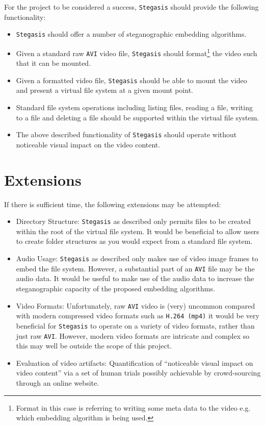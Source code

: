 \documentclass[paper=a4, fontsize=11pt,twoside]{scrartcl}    %
\numberwithin{table}{section}
\numberwithin{figure}{section}
\numberwithin{algorithm}{section}
\begin{document}
For the project to be considered a success, \texttt{Stegasis} should provide the following functionality:
\begin{itemize}
\item \texttt{Stegasis} should offer a number of steganographic embedding algorithms.
\item Given a standard raw \texttt{AVI} video file, \texttt{Stegasis} should format\footnote{Format in this case is referring to writing some meta data to the video e.g. which embedding algorithm is being used.} the video such that it can be mounted.
\item Given a formatted video file, \texttt{Stegasis} should be able to mount the video and present a virtual file system at a given mount point.
\item Standard file system operations including listing files, reading a file, writing to a file and deleting a file should be supported within the virtual file system.
\item The above described functionality of \texttt{Stegasis} should operate without noticeable visual impact on the video content.
\end{itemize}

\section*{Extensions}

If there is sufficient time, the following extensions may be attempted:
\begin{itemize}
\item Directory Structure: \texttt{Stegasis} as described only permits files to be created within the root of the virtual file system. It would be beneficial to allow users to create folder structures as you would expect from a standard file system.
\item Audio Usage: \texttt{Stegasis} as described only makes use of video image frames to embed the file system. However, a substantial part of an \texttt{AVI} file may be the audio data. It would be useful to make use of the audio data to increase the steganographic capacity of the proposed embedding algorithms.
\item Video Formats: Unfortunately, raw \texttt{AVI} video is (very) uncommon compared with modern compressed video formats such as \texttt{H.264 (mp4)} it would be very beneficial for \texttt{Stegasis} to operate on a variety of video formats, rather than just raw \texttt{AVI}. However, modern video formats are intricate and complex so this may well be outside the scope of this project.
\item Evaluation of video artifacts: Quantification of ``noticeable visual impact on video content'' via a set of human trials possibly achievable by crowd-sourcing through an online website.
\end{itemize}
\end{document}

